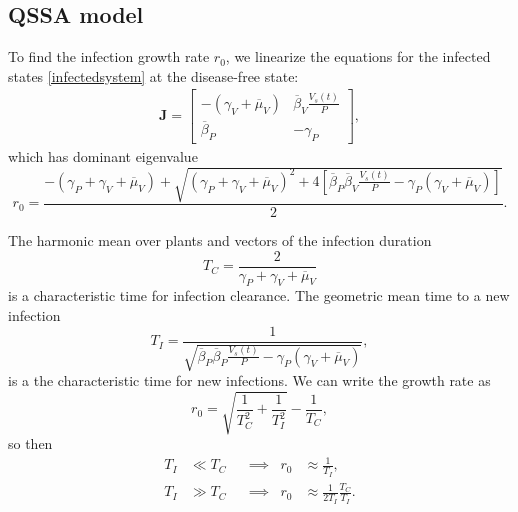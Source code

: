 \documentclass{article}
\newcommand{\mat}[1]{\mathbf{#1}}
\begin{document}
\subsection{QSSA model}

To find the infection growth rate $r_0$, we linearize the equations for
the infected states \eqref{infectedsystem} at the disease-free
state:
\begin{align}
  \mat{J} =
  \begin{bmatrix}
    - (\gamma_V + \overline{\mu}_V)
    &
    \overline{\beta}_V \frac{V_s(t)}{P}
    \\
    \overline{\beta}_P
    &
    - \gamma_P
  \end{bmatrix},
\end{align}
which has dominant eigenvalue
\begin{equation}
  \label{rQSSA}
  r_0 = \frac{- (\gamma_P + \gamma_V + \overline{\mu}_V)
    + \sqrt{(\gamma_P + \gamma_V + \overline{\mu}_V)^2
      + 4 \left[\overline{\beta}_P \overline{\beta}_V \frac{V_s(t)}{P}
        - \gamma_P (\gamma_V + \overline{\mu}_V)\right]}}{2}.
\end{equation}

The harmonic mean over plants and vectors of the infection duration
\begin{equation}
  T_C = \frac{2}{\gamma_P + \gamma_V + \overline{\mu}_V}
\end{equation}
is a characteristic time for infection clearance.  The geometric
mean time to a new infection
\begin{equation}
  T_I =
  \frac{1}{\sqrt{\overline{\beta}_P \overline{\beta}_P
      \frac{V_s(t)}{P}
      - \gamma_P (\gamma_V + \overline{\mu}_V)}},
\end{equation}
is a the characteristic time for new infections.  We can write the
growth rate as
\begin{equation}
  r_0 = \sqrt{\frac{1}{T_C^2} + \frac{1}{T_I^2}} - \frac{1}{T_C},
\end{equation}
so then
\begin{equation}
  \begin{aligned}
    T_I &\ll T_C
    & & \implies &
    r_0 &\approx \frac{1}{T_I},
    \\
    T_I &\gg T_C
    & & \implies &
    r_0 &\approx \frac{1}{2 T_I} \frac{T_C}{T_I}.
  \end{aligned}
\end{equation}
\end{document}
